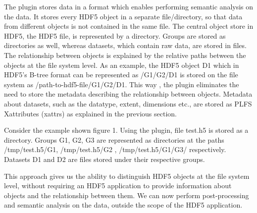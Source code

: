 The plugin stores data in a format which enables performing semantic analysis on the data. 
It stores every HDF5 object in a separate file/directory, so that data from different objects is not contained in the same file. 
The central object store in HDF5, the HDF5 file, is represented by a directory. Groups are stored as directories as well, whereas datasets, which contain raw data, are stored in files. 
The relationship between objects is explained by the relative paths between the objects at the file system level. As an example, the HDF5 object D1 which in HDF5's B-tree format can be represented as /G1/G2/D1 is stored on the file system as /path-to-hdf5-file/G1/G2/D1. This way , the plugin eliminates the need to store the metadata describing the relationship between objects. Metadata about datasets, such as the datatype, extent, dimensions etc., are stored as PLFS Xattributes (xattrs) as explained in the previous section. 

Consider the example shown figure 1. Using the plugin, file test.h5 is stored as a directory. Groups G1, G2, G3 are represented as directories at the paths /tmp/test.h5/G1, /tmp/test.h5/G2 , /tmp/test.h5/G1/G3/ respectively. Datasets D1 and D2 are files stored under their respective groups. 

This approach gives us the ability to distinguish HDF5 objects at the file system level, without requiring an HDF5 application to provide information about objects and the relationship between them. 
We can now perform post-processing and semantic analysis on the data, outside the scope of the HDF5 application. 


